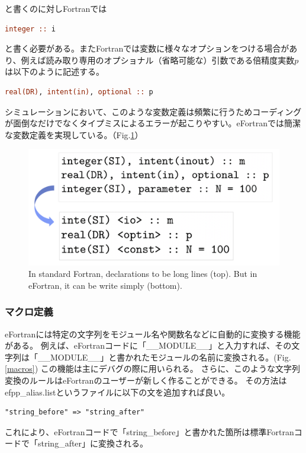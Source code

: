 \documentclass[12pt]{jsarticle}
\begin{document}
\noindent
と書くのに対しFortranでは

\begin{lstlisting}[language=fortran]
integer :: i
\end{lstlisting}

\noindent
と書く必要がある。またFortranでは変数に様々なオプションをつける場合があり、例えば読み取り専用のオプショナル（省略可能な）引数である倍精度実数$p$は以下のように記述する。

\begin{lstlisting}[language=fortran]
real(DR), intent(in), optional :: p
\end{lstlisting}

\noindent
シミュレーションにおいて、このような変数定義は頻繁に行うためコーディングが面倒なだけでなくタイプミスによるエラーが起こりやすい。eFortranでは簡潔な変数定義を実現している。（Fig.\ref{declarations}）

\begin{figure}[H]
\centering
\includegraphics[height=0.5\textheight,width=1.0\hsize,angle=0,keepaspectratio]{./Image/declarations.png}
\caption{In standard Fortran, declarations to be long lines (top). But in eFortran, it can be write simply (bottom).} \label{declarations}
\end{figure}

\subsubsection{マクロ定義}
eFortranには特定の文字列をモジュール名や関数名などに自動的に変換する機能がある。
例えば、eFortranコードに「\_\_MODULE\_\_」と入力すれば、その文字列は「\_\_MODULE\_\_」と書かれたモジュールの名前に変換される。(Fig.\ref{macros})
この機能は主にデバグの際に用いられる。
さらに、このような文字列変換のルールはeFortranのユーザーが新しく作ることができる。
その方法はefpp\_alias.listというファイルに以下の文を追加すれば良い。
\begin{lstlisting}
"string_before" => "string_after"
\end{lstlisting}
これにより、eFortranコードで「string\_before」と書かれた箇所は標準Fortranコードで「string\_after」に変換される。
\end{document}
